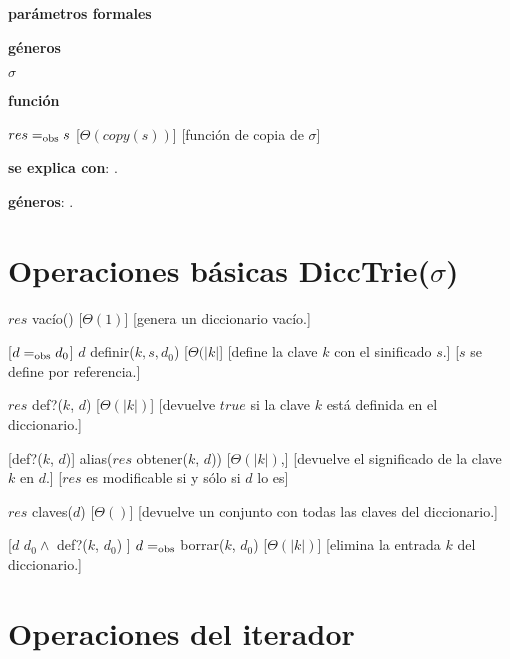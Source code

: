 \begin{Interfaz}
  \textbf{parámetros formales}\parindent\\
  \parbox{1.7cm}{\textbf{géneros}} $\sigma$\\
  \parbox[t]{1.7cm}{\textbf{función}}\parbox[t]{\textwidth-2\parindent-1.7cm}{    	
    {$res =_{\mathrm{obs}} s$}
    [$\Theta(copy(s))$]
    [función de copia de $\sigma$]
    }
      
  \textbf{se explica con}: .

  \textbf{géneros}: .

  \section*{Operaciones básicas DiccTrie($\sigma$)}

  {$res$ \igobs vacío()}
  [$\Theta(1)$]
  [genera un diccionario vacío.]

  [$d =_{\mathrm{obs}} d_0$]  
  {$d$ \igobs definir($k, s, d_0$)}
  [$\Theta(|k|$]
  [define la clave $k$ con el sinificado $s$.]
  [$s$ se define por referencia.]
    
  {$res$ \igobs def?($k$, $d$) }
  [$\Theta(|k|)$]
  [devuelve $true$ si la clave $k$ está definida en el diccionario.]
  
  [def?($k$, $d$)]  
  {alias($res$ \igobs obtener($k$, $d$))}
  [$\Theta(|k|)$,]
  [devuelve el significado de la clave $k$ en $d$.]
  [$res$ es modificable si y sólo si $d$ lo es]
  
  {$res$ \igobs claves($d$)}
  [$\Theta()$]
  [devuelve un conjunto con todas las claves del diccionario.] 
  
  [$d$ \igobs $d_0 \land$ def?($k$, $d_0$) ]
  {$d =_{\mathrm{obs}}$ borrar($k$, $d_0$)}
  [$\Theta(|k|)$]
  [elimina la entrada $k$ del diccionario.] 
  
  \section*{Operaciones del iterador}


\end{Interfaz}
